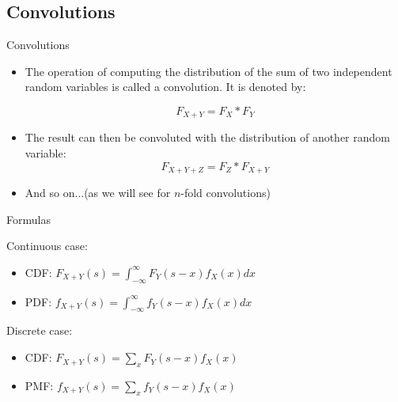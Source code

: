\documentclass[11pt]{beamer}
\begin{document}
\subsection{Convolutions}
\begin{frame}{Convolutions}
\begin{itemize}

\item The operation of computing the distribution of the sum of two independent random variables is called a \alert{convolution}. It is denoted by:


$$F_{X+Y}=F_X*F_Y$$

\vfill

\item The result can then be convoluted with the distribution of another random variable:
$$F_{X+Y+Z}=F_Z*F_{X+Y}$$
\vfill
\item And so on...(as we will see for $n$-fold convolutions)


\end{itemize}
\end{frame}
\begin{frame}{Formulas}

Continuous case:
   \begin{itemize}
    \item CDF: $F_{X+Y}\left( s\right) =\int_{-\infty }^{\infty}F_{Y}\left( s-x\right) f_{X}\left( x\right) dx$
    \item PDF: $f_{X+Y}\left( s\right) =\int_{-\infty }^{\infty}f_{Y}\left( s-x\right) f_{X}\left( x\right) dx$
  \end{itemize}
  
\vfill  

Discrete case:

\begin{itemize}
    \item CDF: $F_{X+Y}\left( s\right) =\sum_{x}F_{Y}\left( s-x\right)f_{X}\left( x\right) $
    \item PMF: $f_{X+Y}\left( s\right) =\sum_{x}f_{Y}\left(s-x\right) f_{X}\left( x\right) $
    \end{itemize}

\end{frame}
\end{document}
